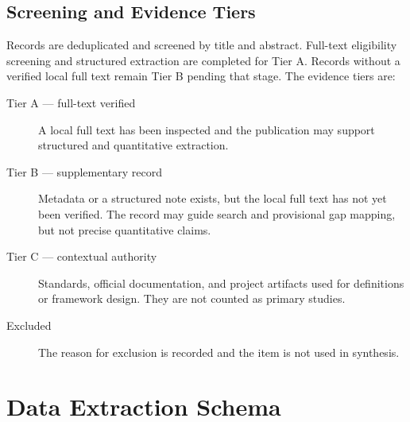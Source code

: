 \subsection{Screening and Evidence Tiers}

Records are deduplicated and screened by title and abstract. Full-text
eligibility screening and structured extraction are completed for Tier A.
Records without a verified local full text remain Tier B pending that stage.
The evidence tiers are:

\begin{description}
  \item[Tier A --- full-text verified] A local full text has been inspected
    and the publication may support structured and quantitative extraction.
  \item[Tier B --- supplementary record] Metadata or a structured note exists,
    but the local full text has not yet been verified. The record may guide
    search and provisional gap mapping, but not precise quantitative claims.
  \item[Tier C --- contextual authority] Standards, official documentation,
    and project artifacts used for definitions or framework design. They are
    not counted as primary studies.
  \item[Excluded] The reason for exclusion is recorded and the item is not
    used in synthesis.
\end{description}

\section{Data Extraction Schema}

